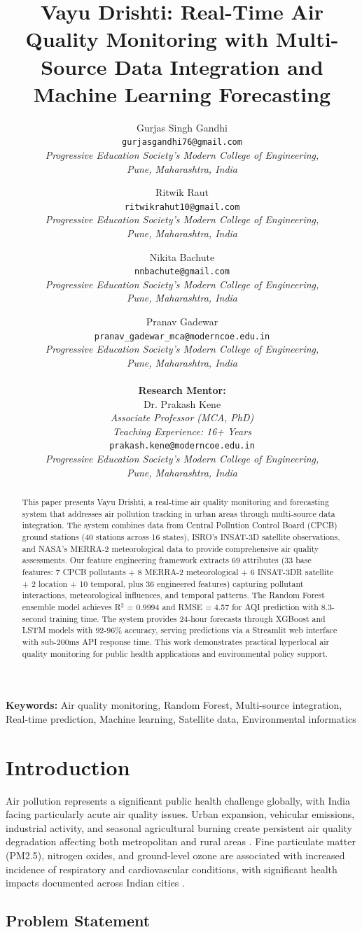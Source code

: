 \documentclass[12pt]{article}
\title{\textbf{Vayu Drishti: Real-Time Air Quality Monitoring with Multi-Source Data Integration and Machine Learning Forecasting}}
\author{
  Gurjas Singh Gandhi \\
  \texttt{gurjasgandhi76@gmail.com} \\
  \textit{Progressive Education Society's Modern College of Engineering,} \\
  \textit{Pune, Maharashtra, India} \\
  \and
  Ritwik Raut \\
  \texttt{ritwikrahut10@gmail.com} \\
  \textit{Progressive Education Society's Modern College of Engineering,} \\
  \textit{Pune, Maharashtra, India} \\
  \and
  Nikita Bachute \\
  \texttt{nnbachute@gmail.com} \\
  \textit{Progressive Education Society's Modern College of Engineering,} \\
  \textit{Pune, Maharashtra, India} \\
  \and
  Pranav Gadewar \\
  \texttt{pranav\_gadewar\_mca@moderncoe.edu.in} \\
  \textit{Progressive Education Society's Modern College of Engineering,} \\
  \textit{Pune, Maharashtra, India}
  \\ \\
  \textbf{Research Mentor:} \\
  Dr. Prakash Kene \\
  \textit{Associate Professor (MCA, PhD)} \\
  \textit{Teaching Experience: 16+ Years} \\
  \texttt{prakash.kene@moderncoe.edu.in} \\
  \textit{Progressive Education Society's Modern College of Engineering,} \\
  \textit{Pune, Maharashtra, India}
}
\date{}
\begin{document}
\maketitle

\begin{abstract}
This paper presents Vayu Drishti, a real-time air quality monitoring and forecasting system that addresses air pollution tracking in urban areas through multi-source data integration. The system combines data from Central Pollution Control Board (CPCB) ground stations (40 stations across 16 states), ISRO's INSAT-3D satellite observations, and NASA's MERRA-2 meteorological data to provide comprehensive air quality assessments. Our feature engineering framework extracts 69 attributes (33 base features: 7 CPCB pollutants + 8 MERRA-2 meteorological + 6 INSAT-3DR satellite + 2 location + 10 temporal, plus 36 engineered features) capturing pollutant interactions, meteorological influences, and temporal patterns. The Random Forest ensemble model achieves R$^2$ = 0.9994 and RMSE = 4.57 for AQI prediction with 8.3-second training time. The system provides 24-hour forecasts through XGBoost and LSTM models with 92-96\% accuracy, serving predictions via a Streamlit web interface with sub-200ms API response time. This work demonstrates practical hyperlocal air quality monitoring for public health applications and environmental policy support.
\end{abstract}

\textbf{Keywords:} Air quality monitoring, Random Forest, Multi-source integration, Real-time prediction, Machine learning, Satellite data, Environmental informatics

\section{Introduction}

Air pollution represents a significant public health challenge globally, with India facing particularly acute air quality issues. Urban expansion, vehicular emissions, industrial activity, and seasonal agricultural burning create persistent air quality degradation affecting both metropolitan and rural areas \citep{vohra2022urgent}. Fine particulate matter (PM2.5), nitrogen oxides, and ground-level ozone are associated with increased incidence of respiratory and cardiovascular conditions, with significant health impacts documented across Indian cities \citep{patel2024health,rosca2025datadriven}.

\subsection{Problem Statement}
\end{document}
